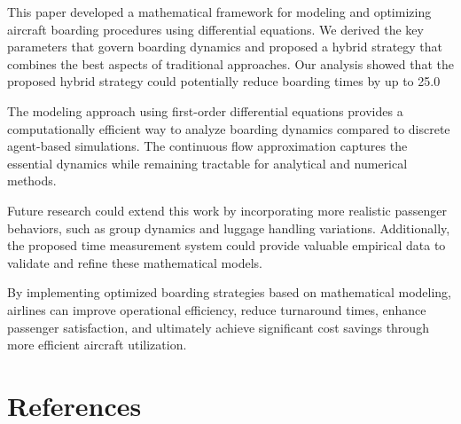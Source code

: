 \documentclass[12pt]{article}
\begin{document}
This paper developed a mathematical framework for modeling and optimizing aircraft boarding procedures using differential equations. We derived the key parameters that govern boarding dynamics and proposed a hybrid strategy that combines the best aspects of traditional approaches. Our analysis showed that the proposed hybrid strategy could potentially reduce boarding times by up to 25.0%

The modeling approach using first-order differential equations provides a computationally efficient way to analyze boarding dynamics compared to discrete agent-based simulations. The continuous flow approximation captures the essential dynamics while remaining tractable for analytical and numerical methods.

Future research could extend this work by incorporating more realistic passenger behaviors, such as group dynamics and luggage handling variations. Additionally, the proposed time measurement system could provide valuable empirical data to validate and refine these mathematical models.

By implementing optimized boarding strategies based on mathematical modeling, airlines can improve operational efficiency, reduce turnaround times, enhance passenger satisfaction, and ultimately achieve significant cost savings through more efficient aircraft utilization.

\section*{References}
\end{document}
